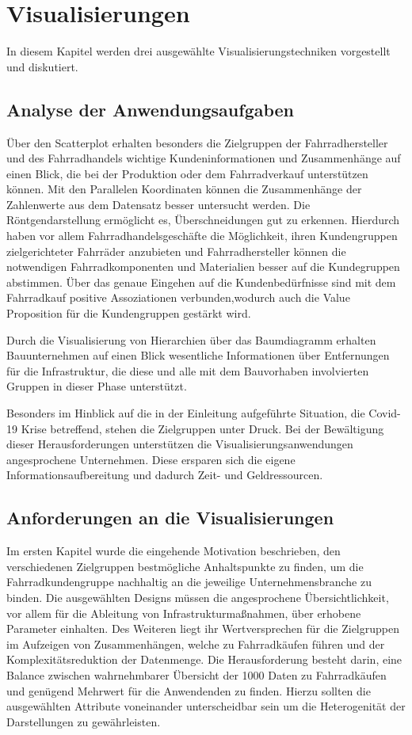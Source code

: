 \documentclass[usegeometry=true]{scrartcl}
\begin{document}
\section{Visualisierungen}
In diesem Kapitel werden drei ausgewählte Visualisierungstechniken vorgestellt und diskutiert.
\subsection{Analyse der Anwendungsaufgaben}
Über den Scatterplot erhalten besonders die Zielgruppen der Fahrradhersteller und des Fahrradhandels wichtige Kundeninformationen und Zusammenhänge auf einen Blick, die bei der Produktion oder dem Fahrradverkauf unterstützen können. 
Mit den Parallelen Koordinaten können die Zusammenhänge der Zahlenwerte aus dem Datensatz besser untersucht werden. Die Röntgendarstellung ermöglicht es, Überschneidungen gut zu erkennen. Hierdurch haben vor allem Fahrradhandelsgeschäfte die Möglichkeit, ihren Kundengruppen zielgerichteter Fahrräder anzubieten und Fahrradhersteller können die notwendigen Fahrradkomponenten und Materialien besser auf die Kundegruppen abstimmen.
Über das genaue Eingehen auf die Kundenbedürfnisse sind mit dem Fahrradkauf positive Assoziationen verbunden,wodurch auch die Value Proposition für die Kundengruppen gestärkt wird. 


Durch die Visualisierung von Hierarchien über das Baumdiagramm erhalten Bauunternehmen auf einen Blick wesentliche Informationen über Entfernungen für die Infrastruktur, die diese und alle mit dem Bauvorhaben involvierten Gruppen in dieser Phase unterstützt.

Besonders im Hinblick auf die in der Einleitung aufgeführte Situation, die Covid-19 Krise betreffend, stehen die Zielgruppen unter Druck. Bei der Bewältigung dieser Herausforderungen unterstützen die Visualisierungsanwendungen angesprochene Unternehmen. Diese ersparen sich die eigene Informationsaufbereitung und dadurch Zeit- und Geldressourcen. 
\subsection{Anforderungen an die Visualisierungen}
Im ersten Kapitel wurde die eingehende Motivation beschrieben, den verschiedenen Zielgruppen bestmögliche Anhaltspunkte zu finden, um die Fahrradkundengruppe nachhaltig an die jeweilige Unternehmensbranche zu binden. Die ausgewählten Designs müssen die angesprochene Übersichtlichkeit, vor allem für die Ableitung von Infrastrukturmaßnahmen, über erhobene Parameter einhalten. Des Weiteren liegt ihr Wertversprechen für die Zielgruppen im Aufzeigen von Zusammenhängen, welche zu Fahrradkäufen führen und der Komplexitätsreduktion der Datenmenge. Die Herausforderung besteht darin, eine Balance zwischen wahrnehmbarer Übersicht der 1000 Daten zu Fahrradkäufen und genügend Mehrwert für die Anwendenden zu finden. Hierzu sollten die ausgewählten Attribute voneinander unterscheidbar sein um die Heterogenität der Darstellungen zu gewährleisten.
\end{document}
